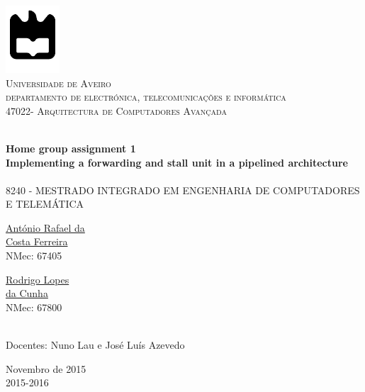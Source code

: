 \begin{titlepage}

\begin{center}

\includegraphics[width=0.15\textwidth]{./logo}\\[0.5cm]    

\textsc{\large Universidade de Aveiro \\[1cm]\large departamento de electrónica, telecomunicações e informática}\\[1cm]

\textsc{\large{47022}\large - Arquitectura de Computadores Avançada \\[1cm]}

\HRule \\[0.5cm]
{ \huge \bfseries  Home group assignment 1}\\[0.4cm]
{ \large \bfseries Implementing a forwarding and stall unit in a pipelined architecture}\\[0.4cm]
\HRule \\[1cm]

\textsc{\small{8240 - MESTRADO INTEGRADO EM ENGENHARIA DE COMPUTADORES E TELEMÁTICA}}\\[1cm]

\begin{minipage}{0.4\textwidth}

\begin{flushleft} \large
\href{mailto:rafael.ferreira@ua.pt}{António Rafael da \\ Costa Ferreira }
 \small{\\NMec: 67405}
\end{flushleft}
\end{minipage}
\begin{minipage}{0.4\textwidth}

\begin{flushright} \large
\href{mailto:rodrigocunha@ua.pt}{Rodrigo Lopes \\ da Cunha}
\small{\\NMec: 67800}
\end{flushright}
\end{minipage}\\[1cm]

{\large Docentes: Nuno Lau e José Luís Azevedo   }\\[0.5cm]

\vfill

{\large Novembro de 2015 \\ 2015-2016}

\end{center}

\end{titlepage}